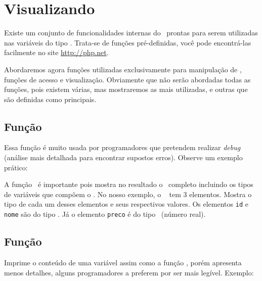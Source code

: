 

\section{Visualizando \tipoarrays}
\label{visualizando-arrays}

Existe um conjunto de funcionalidades internas do \php~prontas para serem utilizadas nas variáveis
do tipo \tipoarray. Trata-se de funções pré-definidas, você pode encontrá-las facilmente no 
site \url{http://php.net}.

Abordaremos agora funções utilizadas exclusivamente para manipulação de \tipoarray, 
funções de acesso e visualização. Obviamente que não serão abordadas todas as funções, 
pois existem várias, mas mostraremos as mais utilizadas, e outras que são definidas como principais.

\subsection{Função \funcaovardump}
\label{funcao-vardump}

Essa função é muito usada por programadores que pretendem realizar \textit{debug}
(análise mais detalhada para encontrar supostos erros). Observe um exemplo prático:




A função \funcaovardump~é importante pois mostra no resultado o \tipoarray~completo
incluindo os tipos de variáveis que compõem o \tipoarray. No nosso exemplo, o \tipoarray~
tem 3 elementos. Mostra o tipo de cada um desses elementos e seus respectivos valores. 
Os elementos \texttt{id} e \texttt{nome} são do tipo \tipostring. Já o elemento 
\texttt{preco} é do tipo \tipofloat~(número real).

\subsection{Função \funcaoprintr}
\label{funcao-printr}

Imprime o conteúdo de uma variável assim como a função \funcaovardump, porém apresenta 
menos detalhes, alguns programadores a preferem por ser mais legível. Exemplo:



